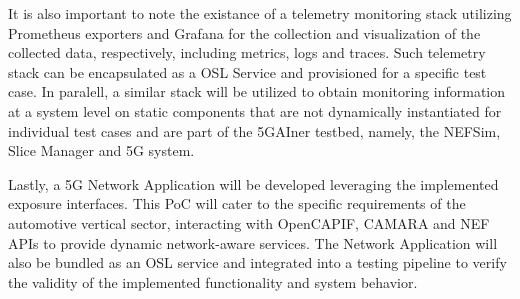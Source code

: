 It is also important to note  the existance of a telemetry monitoring stack utilizing Prometheus exporters and Grafana for the collection and visualization of the collected data, respectively, including metrics, logs and traces. Such telemetry stack can be encapsulated as a \acs{OSL} Service and provisioned for a specific test case. In paralell, a similar stack will be utilized to obtain monitoring information at a system level on static components that are not dynamically instantiated for individual test cases and are part of the 5GAIner testbed, namely, the NEFSim, Slice Manager and \acs{5G} system.

Lastly, a \acs{5G} Network Application will be developed leveraging the implemented exposure interfaces. This \acs{PoC} will cater to the specific requirements of the automotive vertical sector, interacting with OpenCAPIF, CAMARA and \acs{NEF} \acsp{API} to provide dynamic network-aware services. The Network Application will also be bundled as an \acs{OSL} service and integrated into a testing pipeline to verify the validity of the implemented functionality and system behavior.


